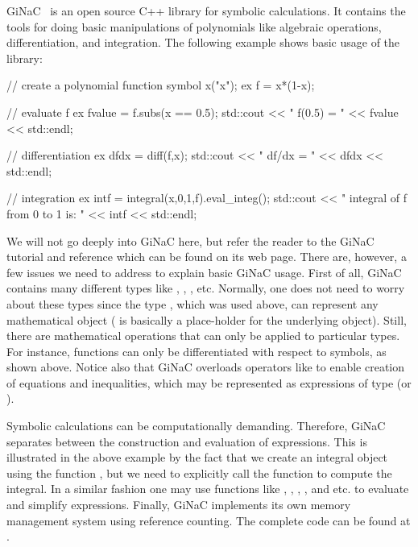 GiNaC~\citep{BauerFrinkKreckel2000} is an open source C++ library
for symbolic calculations.  It contains the tools for doing basic
manipulations of polynomials like algebraic operations, differentiation,
and integration.  The following example shows basic usage of the library:

\pagebreak

\begin{c++}
// create a polynomial function
symbol x("x");
ex f = x*(1-x);

// evaluate f
ex fvalue = f.subs(x == 0.5);
std::cout << " f(0.5) = " << fvalue << std::endl;

// differentiation
ex dfdx  = diff(f,x);
std::cout << " df/dx = " << dfdx << std::endl;

// integration
ex intf  = integral(x,0,1,f).eval_integ();
std::cout << " integral of f from 0 to 1 is: " << intf << std::endl;
\end{c++}

\vspace*{2.5pt}

\noindent We will not go deeply into GiNaC here, but refer the reader to the
GiNaC tutorial and reference which can be found on its web page. There
are, however, a few issues we need to address to explain basic GiNaC
usage. First of all, GiNaC contains many different types like
, , , etc.  Normally, one does not
need to worry about these types since the type , which was
used above, can represent any mathematical object ( is
basically a place-holder for the underlying object). Still, there are
mathematical operations that can only be applied to particular
types. For instance, functions can only be differentiated with respect
to symbols, as shown above.  Notice also that GiNaC overloads
operators like \emp{==} to enable creation of equations and
inequalities, which may be represented as expressions of
type  (or ).

Symbolic calculations can be computationally demanding. Therefore, GiNaC
separates between the construction and evaluation of expressions. This is
illustrated in the above example by the fact that we create an integral
object using the function , but we need to explicitly call
the function  to compute the integral. In a similar
fashion one may use functions like , , ,
, and  etc. to evaluate
and simplify expressions.  Finally, GiNaC implements its own memory
management system using reference counting.  The complete code can be
found at .

